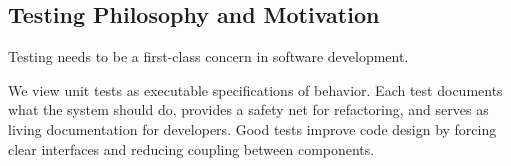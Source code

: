 %
%
%
%
%
%
%
%
%
%


\subsection{Testing Philosophy and Motivation}
Testing needs to be a first-class concern in software development.

We view unit tests as
executable specifications of behavior. Each test documents what the
system should do, provides a safety net for refactoring, and serves as
living documentation for developers. Good tests improve code design by forcing
clear interfaces and reducing coupling between components.

